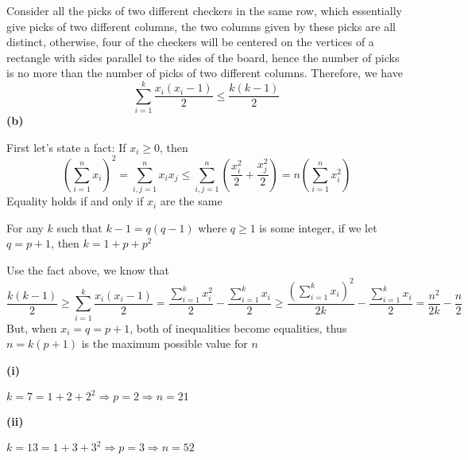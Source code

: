 \documentclass[12pt]{article}
\begin{document}
Consider all the picks of two different checkers in the same row, which essentially give picks of two different columns, the two columns given by these picks are all distinct, otherwise, four of the checkers will be centered on the vertices of a rectangle with sides parallel to the sides of the board, hence the number of picks is no more than the number of picks of two different columns. Therefore, we have
\[
\sum_{i=1}^{k}\dfrac{x_i(x_i-1)}{2}\leq\dfrac{k(k-1)}{2}
\]
\textbf{(b)} \par
First let's state a fact: If $x_i\geq 0$, then
\[
\displaystyle\left(\sum_{i=1}^nx_i\right)^2=\sum_{i,j=1}^{n}x_ix_j\leq\sum_{i,j=1}^{n}\left(\frac{x_i^2}{2}+\frac{x_j^2}{2}\right)=n\left(\sum_{i=1}^nx_i^2\right)
\]
Equality holds if and only if $x_i$ are the same \par
For any $k$ such that $k-1=q(q-1)$ where $q\geq 1$ is some integer, if we let $q=p+1$, then $k=1+p+p^2$ \par
Use the fact above, we know that
\[
\dfrac{k(k-1)}{2}\geq\sum_{i=1}^{k}\dfrac{x_i(x_i-1)}{2}=\dfrac{\sum_{i=1}^{k}x_i^2}{2}-\dfrac{\sum_{i=1}^{k}x_i}{2}\geq\dfrac{\left(\sum_{i=1}^{k}x_i\right)^2}{2k}-\dfrac{\sum_{i=1}^{k}x_i}{2}=\dfrac{n^2}{2k}-\dfrac{n}{2}
\]
But, when $x_i=q=p+1$, both of inequalities become equalities, thus $n=k(p+1)$ is the maximum possible value for $n$ \par
\textbf{(i)} \par
$k=7=1+2+2^2\Rightarrow p=2\Rightarrow n=21$ \par
\textbf{(ii)} \par
$k=13=1+3+3^2\Rightarrow p=3\Rightarrow n=52$ \par
\end{document}
